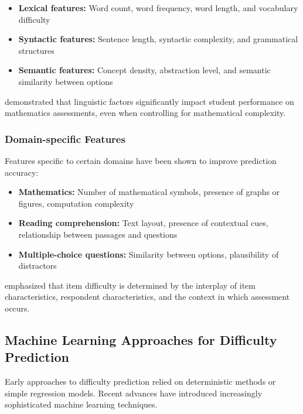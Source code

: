 \documentclass[
    a4paper, %
    10pt, %
    twoside, %
]{LTJournalArticle}
\begin{document}
\begin{itemize}
    \item \textbf{Lexical features:} Word count, word frequency, word length, and vocabulary difficulty \cite{yaneva2019predicting, benedetto2020framework}
    \item \textbf{Syntactic features:} Sentence length, syntactic complexity, and grammatical structures \cite{choi2020predicting}
    \item \textbf{Semantic features:} Concept density, abstraction level, and semantic similarity between options \cite{bulut2023evaluating}
\end{itemize}

\textcite{hickendorff2013} demonstrated that linguistic factors significantly impact student performance on mathematics assessments, even when controlling for mathematical complexity.

\subsubsection{Domain-specific Features}

Features specific to certain domains have been shown to improve prediction accuracy:

\begin{itemize}
    \item \textbf{Mathematics:} Number of mathematical symbols, presence of graphs or figures, computation complexity \cite{benedetto2020r2de}
    \item \textbf{Reading comprehension:} Text layout, presence of contextual cues, relationship between passages and questions \cite{lawrence2022reading}
    \item \textbf{Multiple-choice questions:} Similarity between options, plausibility of distractors \cite{kurdi2016experimental, yaneva2018automatic}
\end{itemize}

\textcite{toyama2021makes} emphasized that item difficulty is determined by the interplay of item characteristics, respondent characteristics, and the context in which assessment occurs.

\subsection{Machine Learning Approaches for Difficulty Prediction}

Early approaches to difficulty prediction relied on deterministic methods or simple regression models. Recent advances have introduced increasingly sophisticated machine learning techniques.
\end{document}
